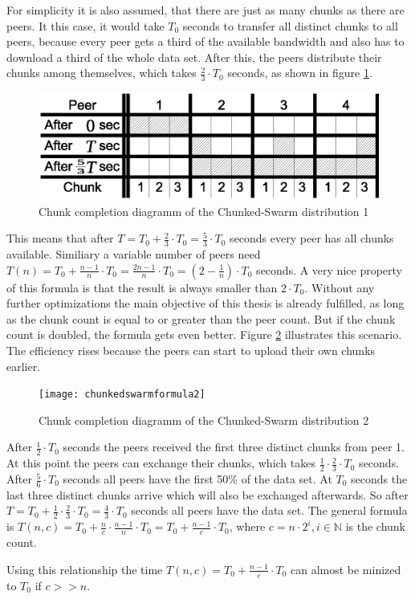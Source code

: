 For simplicity it is also assumed, that there are just as many chunks as there are peers. It this case, it would take $T_0$ seconds to transfer all distinct chunks to all peers, because every peer gets a third of the available bandwidth and also has to download a third of the whole data set. After this, the peers distribute their chunks among themselves, which takes $\frac{2}{3} \cdot T_0$ seconds, as shown in figure \ref{fig:chunkedswarmformula1}.

\begin{figure}[H]
\centering
\includegraphics[width=12cm]{chunkedswarmformula1}
\caption{Chunk completion diagramm of the Chunked-Swarm distribution 1}
\label{fig:chunkedswarmformula1}
\end{figure}

This means that after $T = T_0 + \frac{2}{3} \cdot T_0 = \frac{5}{3} \cdot T_0$ seconds every peer has all chunks available. Similiary a variable number of peers need $T(n) = T_0 + \frac{n - 1}{n} \cdot T_0 = \frac{2n - 1}{n} \cdot T_0 = (2 - \frac{1}{n}) \cdot T_0$ seconds. A very nice property of this formula is that the result is always smaller than $2 \cdot T_0$. Without any further optimizations the main objective of this thesis is already fulfilled, as long as the chunk count is equal to or greater than the peer count. But if the chunk count is doubled, the formula gets even better. Figure \ref{fig:chunkedswarmformula2} illustrates this scenario. The efficiency rises because the peers can start to upload their own chunks earlier.

\begin{figure}[H]
\centering
\texttt{[image: chunkedswarmformula2]}
\caption{Chunk completion diagramm of the Chunked-Swarm distribution 2}
\label{fig:chunkedswarmformula2}
\end{figure}

After $\frac{1}{2} \cdot T_0$ seconds the peers received the first three distinct chunks from peer 1. At this point the peers can exchange their chunks, which takes $\frac{1}{2} \cdot \frac{2}{3} \cdot T_0$ seconds. After $\frac{5}{6} \cdot T_0$ seconds all peers have the first 50\% of the data set. At $T_0$ seconds the last three distinct chunks arrive which will also be exchanged afterwards. So after $T = T_0 + \frac{1}{2} \cdot \frac{2}{3} \cdot T_0 = \frac{4}{3} \cdot T_0$ seconds all peers have the data set. The general formula is $T(n, c) = T_0 + \frac{n}{c} \cdot \frac{n-1}{n} \cdot T_0 =  T_0 + \frac{n-1}{c} \cdot T_0$, where $c = n \cdot 2^i, i \in \mathbb{N}$ is the chunk count.

Using this relationship the time $T(n, c) = T_0 + \frac{n-1}{c} \cdot T_0$ can almost be minized to $T_0$ if $c >> n$.



